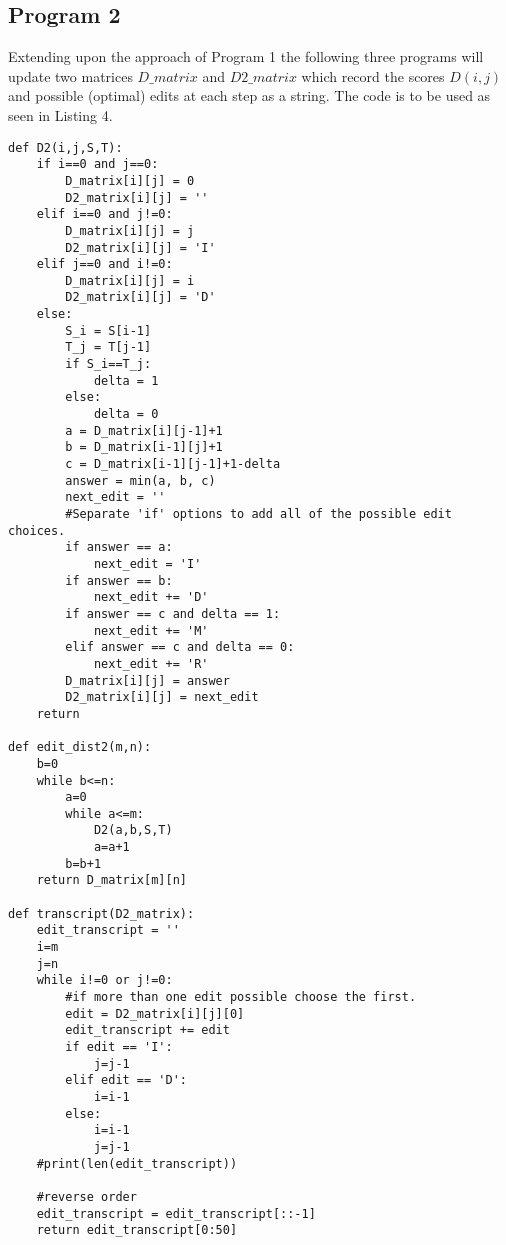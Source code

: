 \documentclass{article}
\begin{document}
\subsection{Program 2}
\vspace{-0.3cm}
\label{subsec:Program 2}
Extending upon the approach of Program 1 the following three programs will update two matrices $D\_matrix$ and $D2\_matrix$ which record the scores $D(i,j)$ and possible (optimal) edits at each step as a string. The code is to be used as seen in Listing 4.
\begin{lstlisting}
def D2(i,j,S,T):
    if i==0 and j==0:
        D_matrix[i][j] = 0
        D2_matrix[i][j] = ''
    elif i==0 and j!=0:
        D_matrix[i][j] = j
        D2_matrix[i][j] = 'I'
    elif j==0 and i!=0:
        D_matrix[i][j] = i
        D2_matrix[i][j] = 'D'
    else:
        S_i = S[i-1]
        T_j = T[j-1]
        if S_i==T_j:
            delta = 1
        else:
            delta = 0
        a = D_matrix[i][j-1]+1
        b = D_matrix[i-1][j]+1
        c = D_matrix[i-1][j-1]+1-delta
        answer = min(a, b, c)
        next_edit = ''
        #Separate 'if' options to add all of the possible edit choices.
        if answer == a:
            next_edit = 'I'
        if answer == b:
            next_edit += 'D'
        if answer == c and delta == 1:
            next_edit += 'M'
        elif answer == c and delta == 0:
            next_edit += 'R'
        D_matrix[i][j] = answer
        D2_matrix[i][j] = next_edit
    return

def edit_dist2(m,n):
    b=0
    while b<=n:
        a=0
        while a<=m:
            D2(a,b,S,T)
            a=a+1
        b=b+1
    return D_matrix[m][n]

def transcript(D2_matrix):
    edit_transcript = ''
    i=m
    j=n
    while i!=0 or j!=0:
        #if more than one edit possible choose the first.
        edit = D2_matrix[i][j][0]
        edit_transcript += edit
        if edit == 'I':
            j=j-1
        elif edit == 'D':
            i=i-1
        else:
            i=i-1
            j=j-1
    #print(len(edit_transcript))

    #reverse order
    edit_transcript = edit_transcript[::-1]
    return edit_transcript[0:50]
\end{lstlisting}
\vspace{-0.5cm}
\end{document}
